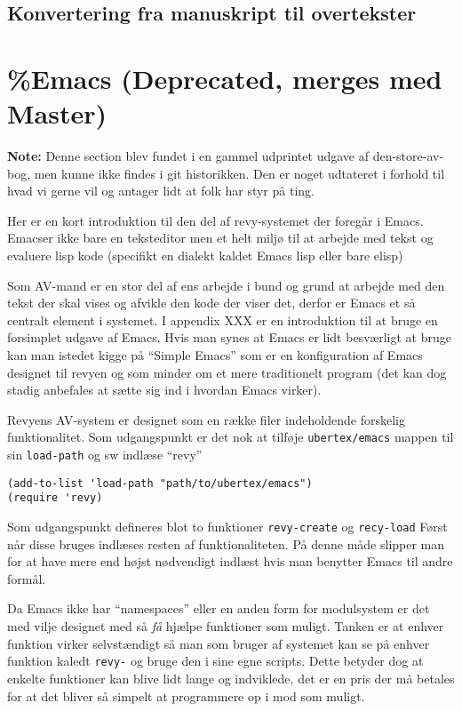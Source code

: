 \documentclass[10pt,a4paper,danish]{article}
\let\oldmarginnote\marginnote
\renewcommand{\marginnote}[1]{\oldmarginnote{\raggedright{}\footnotesize #1}}
\newcommand{\note}[1]{\begin{mdframed}[style=note]\textbf{Note:}
    #1\end{mdframed}}
\newcommand{\code}[1]{\colorbox{verbgray}{\texttt{#1}}}
\begin{document}
\subsection{Konvertering fra manuskript til overtekster}
\label{subsec:konvertering-manus-overtekst}

\newpage
\section*{\%Emacs (Deprecated, merges med Master)}
\note{Denne section blev fundet i en gammel udprintet udgave af
  den-store-av-bog, men kunne ikke findes i git historikken.
Den er noget udtateret i forhold til hvad vi gerne vil og antager lidt at folk
har styr på ting.}

Her er en kort introduktion til den del af revy-systemet der foregår i Emacs.
Emacser ikke bare en teksteditor men et helt miljø til at arbejde med tekst og
evaluere lisp kode (specifikt en dialekt kaldet Emacs lisp eller bare elisp)

Som AV-mand er en stor del af ens arbejde i bund og grund at arbejde med den
tekst der skal vises og afvikle den kode der viser det, derfor er Emacs et så
centralt element i systemet. I appendix XXX\marginnote{\note{Nej der er ej}} er en
introduktion til at bruge en forsimplet udgave af Emacs. Hvis man synes at Emacs
er lidt besværligt at bruge kan man istedet kigge på ``Simple Emacs'' som er en
konfiguration af Emacs designet til revyen og som minder om et mere traditionelt
program (det kan dog stadig anbefales at sætte sig ind i hvordan Emacs virker).

Revyens AV-system er designet som en række filer indeholdende forskelig
funktionalitet. Som udgangspunkt er det nok at tilføje \code{ubertex/emacs}
mappen til sin \code{load-path} og sw indlæse ``revy''

\begin{verbatim}
(add-to-list 'load-path "path/to/ubertex/emacs")
(require 'revy)
\end{verbatim}

Som udgangspunkt defineres blot to funktioner \code{revy-create} og
\code{recy-load} Først når disse bruges indlæses resten af funktionaliteten. På
denne måde slipper man for at have mere end højst nødvendigt indlæst hvis man
benytter Emacs til andre formål.

Da Emacs ikke har ``namespaces'' eller en anden form for modulsystem er det med
vilje designet med så \textit{få} hjælpe funktioner som muligt. Tanken er at
enhver funktion virker selvstændigt så man som bruger af systemet kan se på
enhver funktion kaledt \code{revy-} og bruge den i sine egne scripts.
Dette betyder dog at enkelte funktioner kan blive lidt lange og indviklede, det
er en pris der må betales for at det bliver så simpelt at programmere op i mod
som muligt.\marginnote{Implementerings noter?}
\end{document}
